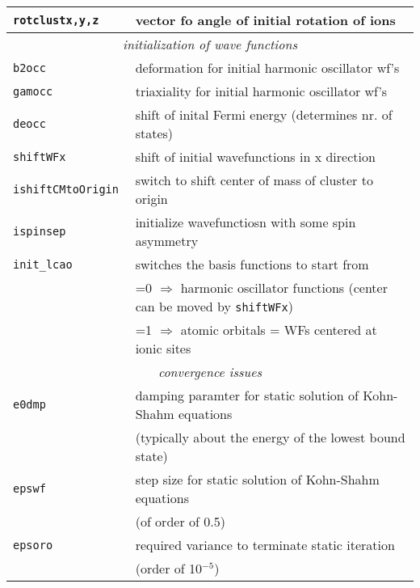 \documentclass[12pt]{article}
\begin{document}
\begin{tabular}{ll}
{\tt rotclustx,y,z } & vector fo angle of initial rotation of ions\\
\hline
\multicolumn{2}{c}{\it initialization of wave functions} \\
\hline
{\tt b2occ            }& deformation for initial harmonic oscillator wf's\\
{\tt gamocc           }& triaxiality for initial harmonic oscillator wf's\\
{\tt deocc            }& shift of inital Fermi energy (determines nr. of
states)\\
{\tt shiftWFx         }& shift of initial wavefunctions in x direction \\
{\tt ishiftCMtoOrigin }& switch to shift center of mass of cluster to origin\\
{\tt ispinsep         }& initialize wavefunctiosn with some spin asymmetry\\
{\tt init\_lcao       }& switches the basis functions to start from\\
& =0 $\Longrightarrow$ harmonic oscillator functions (center can be
moved
  by {\tt shiftWFx})
\\
& =1 $\Longrightarrow$ atomic orbitals = WFs centered at ionic sites
\\
\hline
\multicolumn{2}{c}{\it convergence issues} \\
\hline
{\tt e0dmp            }& damping paramter for static solution of Kohn-Shahm equations\\
& (typically about the energy of the lowest bound state)\\
{\tt epswf            }& step size for static solution of Kohn-Shahm
equations\\
& (of order of 0.5)\\
{\tt epsoro           }& required variance to terminate static iteration\\
&(order of 10$^{-5}$)\\
\hline
\end{tabular}

\newpage
\end{document}
